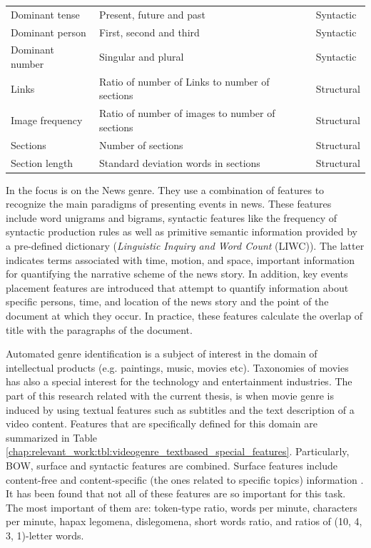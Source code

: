 \begin{table}[t]
\begin{tabular}{p{3cm}p{7cm}p{3cm}}
        Dominant tense & Present, future and past & Syntactic \\
        Dominant person & First, second and third & Syntactic \\
        Dominant number & Singular and plural & Syntactic \\
		Links & Ratio of number of Links to number of sections  & Structural \\
        Image frequency & Ratio of number of images to number of sections  & Structural \\
        Sections & Number of sections & Structural \\
        Section length & Standard deviation words in sections & Structural \\
		\hline
	\end{tabular}
\end{table}

In \parencite{dai2018fine} the focus is on the News genre. They use a combination of features to recognize the main paradigms of presenting events in news. These features include word unigrams and bigrams, syntactic features like the frequency of syntactic production rules as well as primitive semantic information provided by a pre-defined dictionary (\textit{Linguistic Inquiry and Word Count} (LIWC)). The latter indicates terms associated with time, motion, and space, important information for quantifying the narrative scheme of the news story. In addition, key events placement features are introduced that attempt to quantify information about specific persons, time, and location of the news story and the point of the document at which they occur. In practice, these features calculate the overlap of title with the paragraphs of the document.

Automated genre identification is a subject of interest in the domain of intellectual products (e.g. paintings, music, movies etc). Taxonomies of movies has also a special interest for the technology and entertainment industries. The part of this research related with the current thesis, is when movie genre is induced by using textual features such as subtitles and the text description of a video content. Features that are specifically defined for this domain are summarized in Table \ref{chap:relevant_work:tbl:videogenre_textbased_special_features}. Particularly, BOW, surface and syntactic features are combined. Surface features include content-free and content-specific (the ones related to specific topics) information \parencite{lee2017text}. It has been found that not all of these features are so important for this task. The most important of them are: token-type ratio, words per minute, characters per minute, hapax legomena, dislegomena, short words ratio, and ratios of (10, 4, 3, 1)-letter words.

